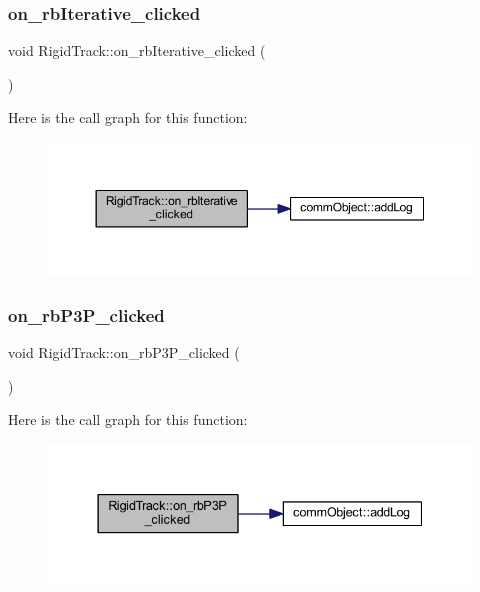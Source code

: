 \subsubsection{on\+\_\+rb\+Iterative\+\_\+clicked}
{\footnotesize\ttfamily void Rigid\+Track\+::on\+\_\+rb\+Iterative\+\_\+clicked (\begin{DoxyParamCaption}{ }\end{DoxyParamCaption})\hspace{0.3cm}{\ttfamily [slot]}}

Here is the call graph for this function\+:\nopagebreak
\begin{figure}[H]
\begin{center}
\leavevmode
\includegraphics[width=350pt]{class_rigid_track_ae5bcdd3fb7203b4a7d1fa97c1460af31_cgraph}
\end{center}
\end{figure}
\mbox{\label{class_rigid_track_ac1f10ea5ec3f718c152e245a04776454}} 
\subsubsection{on\+\_\+rb\+P3\+P\+\_\+clicked}
{\footnotesize\ttfamily void Rigid\+Track\+::on\+\_\+rb\+P3\+P\+\_\+clicked (\begin{DoxyParamCaption}{ }\end{DoxyParamCaption})\hspace{0.3cm}{\ttfamily [slot]}}

Here is the call graph for this function\+:\nopagebreak
\begin{figure}[H]
\begin{center}
\leavevmode
\includegraphics[width=337pt]{class_rigid_track_ac1f10ea5ec3f718c152e245a04776454_cgraph}
\end{center}
\end{figure}
\mbox{\label{class_rigid_track_a217ca3d828c99943ea155e6891264b24}} 
